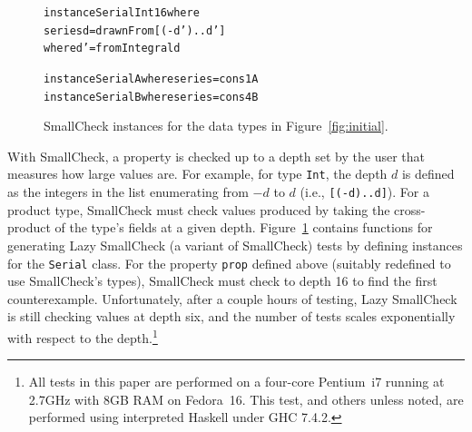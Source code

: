 \documentclass[10pt]{sigplanconf}
\newenvironment{code}{\begin{alltt}}{\end{alltt}}
\newcommand{\ttp}[1]{\texttt{#1}}
\begin{document}
\begin{figure}
  \begin{code}
instance Serial Int16 where
  series d = drawnFrom [(-d')..d']
    where d' = fromIntegral d

instance Serial A where series = cons1 A
instance Serial B where series = cons4 B
  \end{code}
  \caption{SmallCheck instances for the data types in
    Figure~\ref{fig:initial}.}
  \label{fig:smallshrink}
\end{figure}

With SmallCheck, a property is checked up to a depth set by the user that
measures how large values are.  For example, for type \ttp{Int}, the depth $d$
is defined as the integers in the list enumerating from $-d$ to $d$ (i.e.,
\ttp{[(-d)..d]}).  For a product type, SmallCheck must check values produced by
taking the cross-product of the type's fields at a given depth.
Figure~\ref{fig:smallshrink} contains functions for generating Lazy SmallCheck
(a variant of SmallCheck) tests by defining instances for the \ttp{Serial}
class.  For the property \ttp{prop} defined above (suitably redefined to use
SmallCheck's types), SmallCheck must check to depth 16 to find the first
counterexample.  Unfortunately, after a couple hours of testing, Lazy SmallCheck
is still checking values at depth six, and the number of tests scales
exponentially with respect to the depth.\footnote{All tests in this paper are
  performed on a four-core Pentium~i7 running at 2.7GHz with 8GB RAM on
  Fedora~16.  This test, and others unless noted, are performed using
  interpreted Haskell under GHC 7.4.2.}
\end{document}
